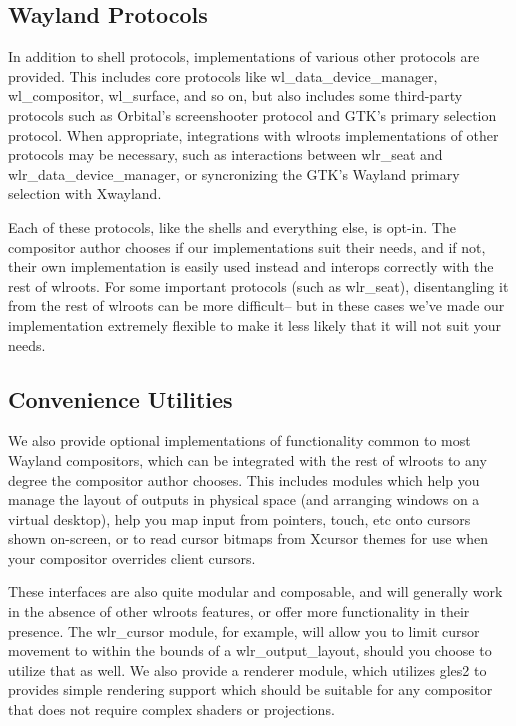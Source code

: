 \documentclass{article}
\begin{document}
\subsection{Wayland Protocols}

In addition to shell protocols, implementations of various other protocols are
provided. This includes core protocols like wl_data_device_manager,
wl_compositor, wl_surface, and so on, but also includes some third-party
protocols such as Orbital's screenshooter protocol and GTK's primary selection
protocol. When appropriate, integrations with wlroots implementations of other
protocols may be necessary, such as interactions between wlr_seat and
wlr_data_device_manager, or syncronizing the GTK's Wayland primary selection
with Xwayland.

Each of these protocols, like the shells and everything else, is opt-in. The
compositor author chooses if our implementations suit their needs, and if not,
their own implementation is easily used instead and interops correctly with the
rest of wlroots. For some important protocols (such as wlr_seat), disentangling
it from the rest of wlroots can be more difficult-- but in these cases we've
made our implementation extremely flexible to make it less likely that it will
not suit your needs.

\subsection{Convenience Utilities}

We also provide optional implementations of functionality common to most Wayland
compositors, which can be integrated with the rest of wlroots to any degree the
compositor author chooses. This includes modules which help you manage the
layout of outputs in physical space (and arranging windows on a virtual
desktop), help you map input from pointers, touch, etc onto cursors shown
on-screen, or to read cursor bitmaps from Xcursor themes for use when your
compositor overrides client cursors.

These interfaces are also quite modular and composable, and will generally work
in the absence of other wlroots features, or offer more functionality in their
presence. The wlr_cursor module, for example, will allow you to limit cursor
movement to within the bounds of a wlr_output_layout, should you choose to
utilize that as well. We also provide a renderer module, which utilizes gles2 to
provides simple rendering support which should be suitable for any compositor
that does not require complex shaders or projections.
\end{document}
